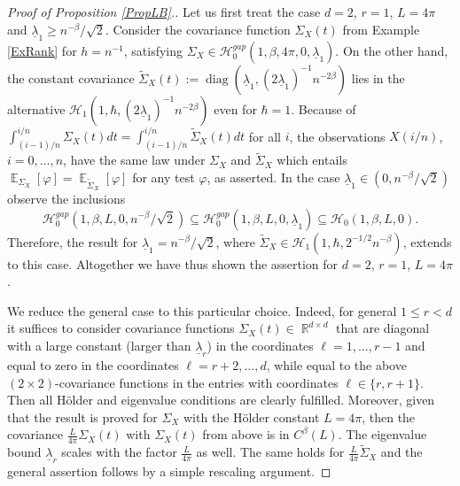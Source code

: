 \documentclass[preprint,aos]{imsart}
\numberwithin{equation}{section}
\theoremstyle{remark}
\DeclareMathOperator{\E}{{\mathbb E}}
\DeclareMathOperator{\R}{{\mathbb R}}
\DeclareMathOperator{\diag}{diag} \DeclareMathOperator{\KL}{KL}
\renewcommand{\phi}{\varphi}
\renewcommand{\subset}{\subseteq}
\renewcommand{\le}{\leqslant}
\renewcommand{\ge}{\geqslant}
\begin{document}
\begin{appendix}
\begin{proof}[Proof of Proposition \ref{PropLB}.]
Let us first treat the case $d=2$, $r=1$, $L=4\pi$ and $\underline\lambda_1\ge n^{-\beta}/\sqrt 2$.
Consider the covariance function $\Sigma_X(t)$ from Example \ref{ExRank} for $h=n^{-1}$, satisfying  $\Sigma_X\in {\mathcal H}_0^{gap}(1,\beta,4\pi,0,\underline\lambda_{1})$. On the other hand, the constant covariance $\tilde\Sigma_X(t):=\diag(\underline\lambda_1,(2\underline\lambda_1)^{-1}n^{-2\beta})$ lies in the alternative ${\mathcal H}_1(1,\hbar,(2\underline\lambda_1)^{-1}n^{-2\beta})$ even for $\hbar=1$. Because of $\int_{(i-1)/n}^{i/n}\Sigma_X(t)dt=\int_{(i-1)/n}^{i/n}\tilde\Sigma_X(t)dt$ for all $i$, the observations $X(i/n)$, $i=0,\ldots,n$, have the same law under $\Sigma_X$ and $\tilde\Sigma_X$ which entails  $\E_{\Sigma_X}[\phi]=\E_{\tilde\Sigma_X}[\phi]$  for any test $\phi$, as asserted.
In the case $\underline\lambda_1\in (0, n^{-\beta}/\sqrt 2)$ observe the inclusions
\[ {\mathcal H}_0^{gap}(1,\beta,L,0,n^{-\beta}/\sqrt 2)\subset {\mathcal H}_0^{gap}(1,\beta,L,0,\underline\lambda_{1}) \subset {\mathcal H}_0(1,\beta,L,0).\]
Therefore, the result for $\underline\lambda_1=n^{-\beta}/\sqrt 2$, where $\tilde\Sigma_X\in {\mathcal H}_1(1,\hbar,2^{-1/2}n^{-\beta})$, extends to this case. Altogether we  have thus shown  the assertion for $d=2$, $r=1$, $L=4\pi$.

We reduce the general case to this particular choice. Indeed, for general $1\le r<d$ it suffices to consider covariance functions $\Sigma_X(t)\in\R^{d\times d}$ that are diagonal with a large constant (larger than $\underline\lambda_r$) in the coordinates $\ell=1,\ldots,r-1$ and equal to zero in the coordinates $\ell=r+2,\ldots,d$, while equal to the above $(2\times2)$-covariance functions in the entries with coordinates $\ell\in\{r,r+1\}$. Then all H\"older and eigenvalue conditions are clearly fulfilled. Moreover, given that the result is proved for $\Sigma_X$ with the H\"older constant $L=4\pi$, then the covariance $\frac{L}{4\pi}\Sigma_X(t)$ with $\Sigma_X(t)$ from above is in $C^\beta(L)$. The eigenvalue bound $\underline\lambda_r$  scales with the factor $\frac{L}{4\pi}$ as well. The same holds for $\frac{L}{4\pi}\tilde\Sigma_X$ and the general assertion follows by a simple rescaling argument.
\end{proof}

\begin{comment} %


\end{comment}
\end{appendix}
\end{document}
